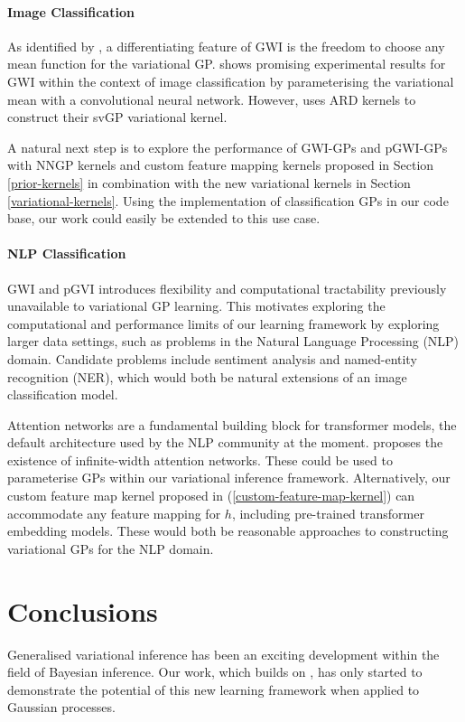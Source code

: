 \documentclass{article}
\numberwithin{equation}{section}
\begin{document}
\paragraph{Image Classification} 
As identified by \cite{wild2022generalized}, a differentiating feature of GWI is the freedom to choose any mean function for the variational GP. 
\cite{wild2022generalized} shows promising experimental results for GWI within the context of image classification by parameterising the variational mean with a convolutional neural network.
However, \cite{wild2022generalized} uses ARD kernels to construct their svGP variational kernel.

A natural next step is to explore the performance of GWI-GPs and pGWI-GPs with NNGP kernels and custom feature mapping kernels proposed in Section \ref{prior-kernels} in combination with the new variational kernels in Section \ref{variational-kernels}.
Using the implementation of classification GPs in our code base, our work could easily be extended to this use case.

\paragraph{NLP Classification} GWI and pGVI introduces flexibility and computational tractability previously unavailable to variational GP learning. 
This motivates exploring the computational and performance limits of our learning framework by exploring larger data settings, such as problems in the Natural Language Processing (NLP) domain.
Candidate problems include sentiment analysis and named-entity recognition (NER), which would both be natural extensions of an image classification model.

Attention networks are a fundamental building block for transformer models, the default architecture used by the NLP community at the moment. \cite{pmlr-v119-hron20a} proposes the existence of infinite-width attention networks.
These could be used to parameterise GPs within our variational inference framework.
Alternatively, our custom feature map kernel proposed in (\ref{custom-feature-map-kernel}) can accommodate any feature mapping for $h$, including pre-trained transformer embedding models. 
These would both be reasonable approaches to constructing variational GPs for the NLP domain.

\newpage
\section{Conclusions}\label{section:conclusions}
Generalised variational inference has been an exciting development within the field of Bayesian inference.
Our work, which builds on \cite{wild2022generalized}, has only started to demonstrate the potential of this new learning framework when applied to Gaussian processes.
\end{document}
